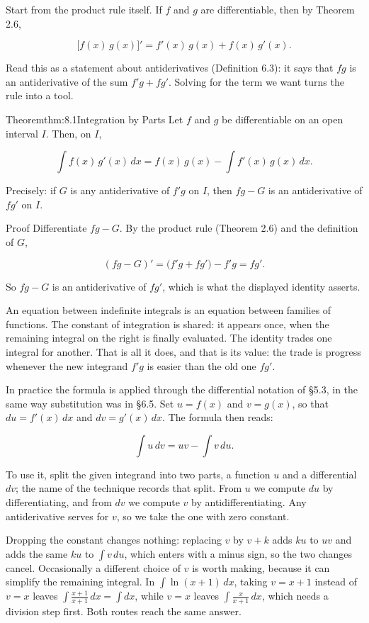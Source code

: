 \documentclass[a4paper,12pt,oneside]{memoir}
\begin{document}
Start from the product rule itself. If \(f\) and \(g\) are differentiable, then by Theorem 2.6,

\[ \bigl[f(x)\,g(x)\bigr]' = f'(x)\,g(x) + f(x)\,g'(x). \]

Read this as a statement about antiderivatives (Definition 6.3): it says that \(fg\) is an antiderivative of the sum \(f'g + fg'\). Solving for the term we want turns the rule into a tool.

\begin{envtheorem}{Theorem}{thm:8.1}{Integration by Parts}
Let \(f\) and \(g\) be differentiable on an open interval \(I\). Then, on \(I\),

\[ \int f(x)\,g'(x)\,dx = f(x)\,g(x) - \int f'(x)\,g(x)\,dx. \]

Precisely: if \(G\) is any antiderivative of \(f'g\) on \(I\), then \(fg - G\) is an antiderivative of \(fg'\) on \(I\).
\end{envtheorem}
\begin{envproof}{Proof}{}{}
Differentiate \(fg - G\). By the product rule (Theorem 2.6) and the definition of \(G\),

\[ (fg - G)' = \bigl(f'g + fg'\bigr) - f'g = fg'. \]

So \(fg - G\) is an antiderivative of \(fg'\), which is what the displayed identity asserts. \qedmark
\end{envproof}
An equation between indefinite integrals is an equation between families of functions. The constant of integration is shared: it appears once, when the remaining integral on the right is finally evaluated. The identity trades one integral for another. That is all it does, and that is its value: the trade is progress whenever the new integrand \(f'g\) is easier than the old one \(fg'\).

In practice the formula is applied through the differential notation of §5.3, in the same way substitution was in §6.5. Set \(u = f(x)\) and \(v = g(x)\), so that \(du = f'(x)\,dx\) and \(dv = g'(x)\,dx\). The formula then reads:

\[ \int u\,dv = uv - \int v\,du. \]

To use it, split the given integrand into two parts, a function \(u\) and a differential \(dv\); the name of the technique records that split. From \(u\) we compute \(du\) by differentiating, and from \(dv\) we compute \(v\) by antidifferentiating. Any antiderivative serves for \(v\), so we take the one with zero constant.

Dropping the constant changes nothing: replacing \(v\) by \(v + k\) adds \(ku\) to \(uv\) and adds the same \(ku\) to \(\int v\,du\), which enters with a minus sign, so the two changes cancel. Occasionally a different choice of \(v\) is worth making, because it can simplify the remaining integral. In \(\int\ln(x + 1)\,dx\), taking \(v = x + 1\) instead of \(v = x\) leaves \(\int\frac{x+1}{x+1}\,dx = \int dx\), while \(v = x\) leaves \(\int\frac{x}{x+1}\,dx\), which needs a division step first. Both routes reach the same answer.
\end{document}

